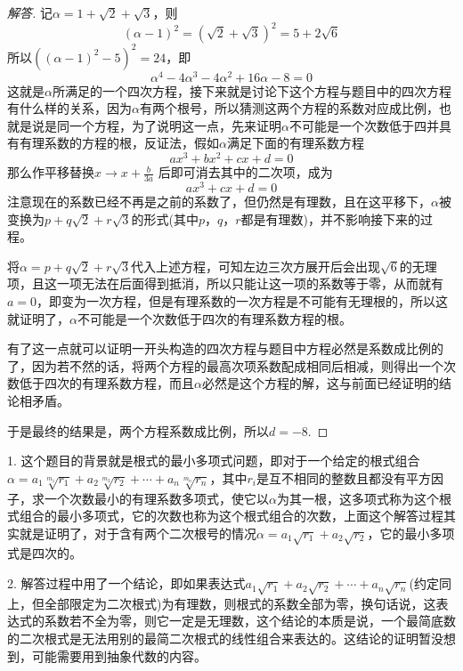 \exerciseFrom[\url{http://kuing.orzweb.net/viewthread.php?tid=4866}]

\exerciseSolvedDate[2017-09-18]

\begin{proof}[解答]
记$\alpha=1+\sqrt{2}+\sqrt{3}$，则
\[ (\alpha-1)^2=(\sqrt{2}+\sqrt{3})^2=5+2\sqrt{6} \]
所以$((\alpha-1)^2-5)^2=24$，即
\[ \alpha^4-4\alpha^3-4\alpha^2+16\alpha-8=0 \]
这就是$\alpha$所满足的一个四次方程，接下来就是讨论下这个方程与题目中的四次方程有什么样的关系，因为$\alpha$有两个根号，所以猜测这两个方程的系数对应成比例，也就是说是同一个方程，为了说明这一点，先来证明$\alpha$不可能是一个次数低于四并具有有理系数的方程的根，反证法，假如$\alpha$满足下面的有理系数方程
\[ ax^3+bx^2+cx+d=0 \]
那么作平移替换$x \to x+\frac{b}{3a}$ 后即可消去其中的二次项，成为
\[ ax^3+cx+d=0 \]
注意现在的系数已经不再是之前的系数了，但仍然是有理数，且在这平移下，$\alpha$被变换为$p+q\sqrt{2}+r\sqrt{3}$的形式(其中$p$，$q$，$r$都是有理数)，并不影响接下来的过程。

将$\alpha=p+q\sqrt{2}+r\sqrt{3}$代入上述方程，可知左边三次方展开后会出现$\sqrt{6}$的无理项，且这一项无法在后面得到抵消，所以只能让这一项的系数等于零，从而就有$a=0$，即变为一次方程，但是有理系数的一次方程是不可能有无理根的，所以这就证明了，$\alpha$不可能是一个次数低于四次的有理系数方程的根。

有了这一点就可以证明一开头构造的四次方程与题目中方程必然是系数成比例的了，因为若不然的话，将两个方程的最高次项系数配成相同后相减，则得出一个次数低于四次的有理系数方程，而且$\alpha$必然是这个方程的解，这与前面已经证明的结论相矛盾。

于是最终的结果是，两个方程系数成比例，所以$d=-8$.
\end{proof}

\begin{exerciseAdditional}
1. 这个题目的背景就是根式的最小多项式问题，即对于一个给定的根式组合$\alpha=a_1\sqrt[m_1]{r_1}+a_2\sqrt[m_2]{r_2}+\cdots+a_n\sqrt[m_n]{r_n}$，其中$r_i$是互不相同的整数且都没有平方因子，求一个次数最小的有理系数多项式，使它以$\alpha$为其一根，这多项式称为这个根式组合的最小多项式，它的次数也称为这个根式组合的次数，上面这个解答过程其实就是证明了，对于含有两个二次根号的情况$\alpha=a_1\sqrt{r_1}+a_2\sqrt{r_2}$，它的最小多项式是四次的。

2. 解答过程中用了一个结论，即如果表达式$a_1\sqrt{r_1}+a_2\sqrt{r_2}+\cdots+a_n\sqrt{r_n}$(约定同上，但全部限定为二次根式)为有理数，则根式的系数全部为零，换句话说，这表达式的系数若不全为零，则它一定是无理数，这个结论的本质是说，一个最简底数的二次根式是无法用别的最简二次根式的线性组合来表达的。这结论的证明暂没想到，可能需要用到抽象代数的内容。
\end{exerciseAdditional}


